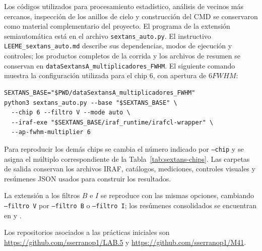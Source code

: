 \documentclass[12pt,letterpaper,oneside]{book}
\begin{document}
Los códigos utilizados para procesamiento estadístico, análisis de vecinos más cercanos, inspección de los anillos de cielo y construcción del CMD se conservaron como material complementario del proyecto. El programa de la extensión semiautomática está en el archivo \texttt{sextans\_auto.py}. El instructivo \texttt{LEEME\_sextans\_auto.md} describe sus dependencias, modos de ejecución y controles; los productos completos de la corrida y los archivos de resumen se conservan en \texttt{dataSextansA\_multiplicadores\_FWHM}. El siguiente comando muestra la configuración utilizada para el chip 6, con apertura de $6FWHM$:

\begin{verbatim}
SEXTANS_BASE="$PWD/dataSextansA_multiplicadores_FWHM"
python3 sextans_auto.py --base "$SEXTANS_BASE" \
  --chip 6 --filtro V --mode auto \
  --iraf-exe "$SEXTANS_BASE/iraf_runtime/irafcl-wrapper" \
  --ap-fwhm-multiplier 6
\end{verbatim}

Para reproducir los demás chips se cambia el número indicado por \texttt{--chip} y se asigna el múltiplo correspondiente de la Tabla~\ref{tab:sextans-chips}. Las carpetas de salida conservan los archivos IRAF, catálogos, mediciones, controles visuales y resúmenes JSON usados para construir los resultados.

La extensión a los filtros $B$ e $I$ se reproduce con las mismas opciones, cambiando \texttt{--filtro V} por \texttt{--filtro B} o \texttt{--filtro I}; los resúmenes consolidados se encuentran en  y .

Los repositorios asociados a las prácticas iniciales son \url{https://github.com/sserranop1/LAB.5} y \url{https://github.com/sserranop1/M41}.


\end{document}
